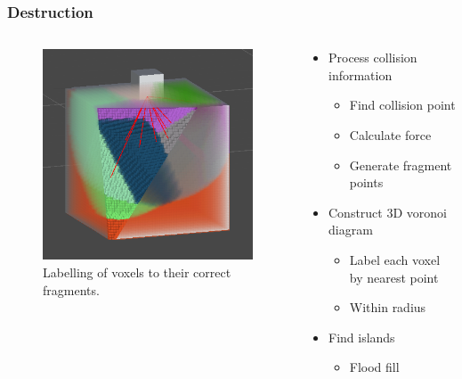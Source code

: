 \documentclass{beamer}
\begin{document}
	\begin{frame}
	\frametitle{Destruction}
		\begin{columns}[T] %
			\begin{column}[T]{5cm} %
				\begin{figure}
					\centerline{\includegraphics[scale=0.5]{Voronoi.png}}
					\caption{Labelling of voxels to their correct fragments.}
				\end{figure}
			\end{column}
			\begin{column}[T]{5cm} %
				\begin{itemize}
				\item{Process collision information}
					\begin{itemize}
						\item{Find collision point}
						\item{Calculate force}
						\item{Generate fragment points}
					\end{itemize}
				\item{Construct 3D voronoi diagram}
					\begin{itemize}
						\item{Label each voxel by nearest point}
						\item{Within radius}
					\end{itemize}
				\item{Find islands}
					\begin{itemize}
						\item{Flood fill}
					\end{itemize}
				\end{itemize}
			\end{column}
		\end{columns}
	\end{frame}
\end{document}

